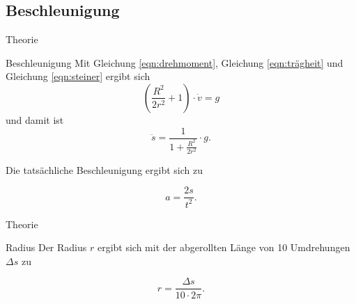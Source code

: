 \subsection{Beschleunigung}
\begin{frame}[t]{Theorie}
    \begin{block}{Beschleunigung}
    Mit Gleichung \eqref{eqn:drehmoment}, Gleichung \eqref{eqn:trägheit} und Gleichung \eqref{eqn:steiner} ergibt sich
    \begin{equation*}
       \left(\frac{R^2}{2 r^2} +1\right) \cdot \dot{v} = g
    \end{equation*}
   und damit ist  
    \begin{equation*}
        \ddot{s} = \frac{1}{1 + \frac{R^2}{2r^2}} \cdot g.
    \end{equation*}

    Die tatsächliche Beschleunigung ergibt sich zu 
    
    \begin{equation*}
        a = \frac{2s}{t^2}.
    \end{equation*}
    \end{block}
\end{frame}

\begin{frame}[t]{Theorie}
    \begin{block}{Radius}
    Der Radius $r$ ergibt sich mit der abgerollten Länge von 10 Umdrehungen $\Delta s$ zu

    \begin{equation*}
        r = \frac{\Delta s}{10 \cdot 2\pi}.
    \end{equation*}
    \end{block}
\end{frame}
